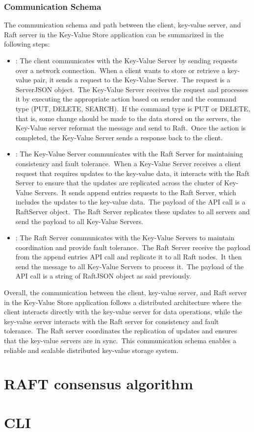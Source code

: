 \documentclass{article}
\begin{document}
\subsubsection{Communication Schema}
The communication schema and path between the client, key-value server, and Raft server in the
Key-Value Store application can be summarized in the following steps:
\begin{itemize}
    \item {}: The client communicates with the Key-Value Server
    by sending requests over a network connection.\ When a client wants to store or retrieve
    a key-value pair, it sends a request to the Key-Value Server.\ The request is a ServerJSON
    object.\ The Key-Value Server receives the request and processes it by executing the
    appropriate action based on sender and the command type (PUT, DELETE, SEARCH).\ If the
    command type is PUT or DELETE, that is, some change should be made to the data stored on
    the servers, the Key-Value server reformat the message and send to Raft.\ Once the
    action is completed, the Key-Value Server sends a response back to the client.
    \item {}: The Key-Value Server communicates with the
    Raft Server for maintaining consistency and fault tolerance.\ When a Key-Value Server
    receives a client request that requires updates to the key-value data, it interacts with
    the Raft Server to ensure that the updates are replicated across the cluster of Key-Value
    Servers.\ It sends append entries requests to the Raft Server, which includes the updates
    to the key-value data.\ The payload of the API call is a RaftServer object.\ The Raft
    Server replicates these updates to all servers and send the payload to all Key-Value
    Servers.
    \item {}: The Raft Server communicates with the Key-Value
    Servers to maintain coordination and provide fault tolerance.\ The Raft Server receive the
    payload from the append entries API call and replicate it to all Raft nodes.\ It then send
    the message to all Key-Value Servers to process it.\ The payload of the API call is a string
    of RaftJSON object as said previously.
\end{itemize}

Overall, the communication between the client, key-value server, and Raft server in the Key-Value
Store application follows a distributed architecture where the client interacts directly with the
key-value server for data operations, while the key-value server interacts with the Raft server
for consistency and fault tolerance.\ The Raft server coordinates the replication of updates and
ensures that the key-value servers are in sync.\ This communication schema enables a reliable and
scalable distributed key-value storage system.


\section{RAFT consensus algorithm}


\section{CLI}


% 
% 
\end{document}
